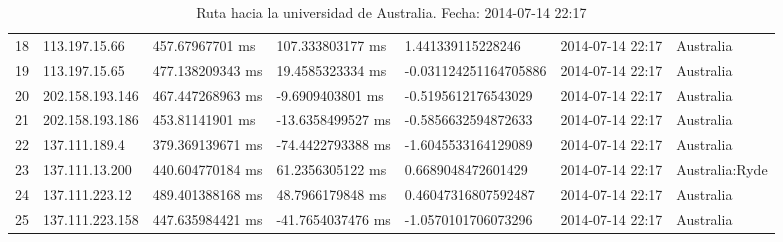 \begin{table}[H]
{\begin{tabular}{lllllll}
18  & 113.197.15.66   & 457.67967701 ms  & 107.333803177 ms  & 1.441339115228246     & 2014-07-14 22:17 & Australia               \\
19  & 113.197.15.65   & 477.138209343 ms & 19.4585323334 ms  & -0.031124251164705886 & 2014-07-14 22:17 & Australia               \\
20  & 202.158.193.146 & 467.447268963 ms & -9.6909403801 ms  & -0.5195612176543029   & 2014-07-14 22:17 & Australia               \\
21  & 202.158.193.186 & 453.81141901 ms  & -13.6358499527 ms & -0.5856632594872633   & 2014-07-14 22:17 & Australia               \\
22  & 137.111.189.4   & 379.369139671 ms & -74.4422793388 ms & -1.6045533164129089   & 2014-07-14 22:17 & Australia               \\
23  & 137.111.13.200  & 440.604770184 ms & 61.2356305122 ms  & 0.6689048472601429    & 2014-07-14 22:17 & Australia:Ryde          \\
24  & 137.111.223.12  & 489.401388168 ms & 48.7966179848 ms  & 0.46047316807592487   & 2014-07-14 22:17 & Australia               \\
25  & 137.111.223.158 & 447.635984421 ms & -41.7654037476 ms & -1.0570101706073296   & 2014-07-14 22:17 & Australia              
\end{tabular}
}
\caption{Ruta hacia la universidad de Australia. Fecha: 2014-07-14 22:17}
\label{my-label}
\end{table}

